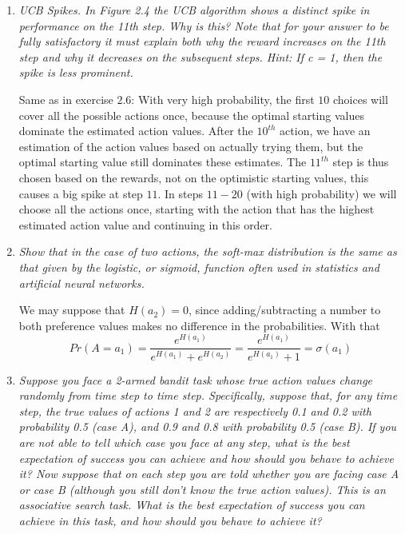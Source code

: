 \documentclass[12pt,a4paper]{article}
\begin{document}
\begin{enumerate}
\item
  \textit{UCB Spikes. In Figure 2.4 the UCB algorithm shows a distinct spike
  in performance on the 11th step. Why is this? Note that for your answer to be fully
  satisfactory it must explain both why the reward increases on the 11th step and why it
  decreases on the subsequent steps. Hint: If c = 1, then the spike is less prominent.}

  Same as in exercise $2.6$: With very high probability, the first $10$ choices will cover all the possible actions
  once, because the optimal starting values dominate the estimated action values.
  After the $10^{th}$ action, we have an estimation of the action values based
  on actually trying them, but the optimal starting value still dominates these estimates.
  The $11^{th}$ step is thus chosen based on the rewards, not on the optimistic starting values,
  this causes a big spike at step $11$. In steps $11-20$ (with high probability) we will
  choose all the actions once, starting with the action that has the highest estimated
  action value and continuing in this order.

\item
  \textit{Show that in the case of two actions, the soft-max distribution is the same
  as that given by the logistic, or sigmoid, function often used in statistics and artificial
  neural networks.}

  We may suppose that $H(a_2) = 0$, since adding/subtracting a number to both preference
  values makes no difference in the probabilities. With that
  \[
  Pr(A = a_1) = \frac{e^{H(a_1)}}{e^{H(a_1)} + e^{H(a_2)}} = \frac{e^{H(a_1)}}{e^{H(a_1)} + 1} = \sigma(a_1)
  \]

\item
  \textit{Suppose you face a 2-armed bandit task whose true action values change
  randomly from time step to time step. Specifically, suppose that, for any time step, the
  true values of actions 1 and 2 are respectively 0.1 and 0.2 with probability 0.5 (case A),
  and 0.9 and 0.8 with probability 0.5 (case B). If you are not able to tell which case you
  face at any step, what is the best expectation of success you can achieve and how should
  you behave to achieve it? Now suppose that on each step you are told whether you are
  facing case A or case B (although you still don’t know the true action values). This is an
  associative search task. What is the best expectation of success you can achieve in this
  task, and how should you behave to achieve it?}


\end{enumerate}
\end{document}
